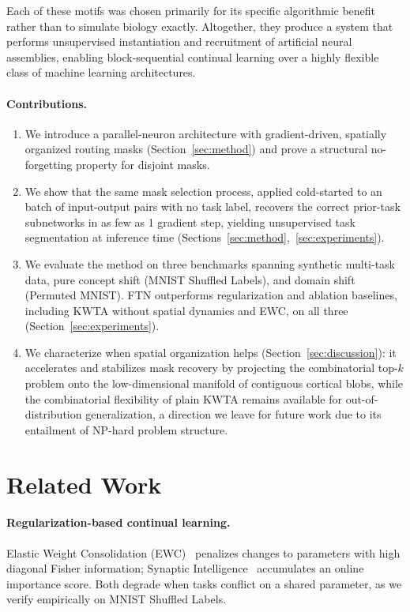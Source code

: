 \documentclass{article}
\begin{document}
Each of these motifs was chosen primarily for its specific algorithmic benefit rather than to simulate biology exactly. Altogether, they produce a system that performs unsupervised instantiation and recruitment of artificial neural assemblies, enabling block-sequential continual learning over a highly flexible class of machine learning architectures.

\paragraph{Contributions.}
\begin{enumerate}
  \item We introduce a parallel-neuron architecture with gradient-driven, spatially organized routing masks (Section~\ref{sec:method}) and prove a structural no-forgetting property for disjoint masks.
  \item We show that the same mask selection process, applied cold-started to an batch of input-output pairs with no task label, recovers the correct prior-task subnetworks in as few as 1 gradient step, yielding unsupervised task segmentation at inference time (Sections~\ref{sec:method},~\ref{sec:experiments}).
  \item We evaluate the method on three benchmarks spanning synthetic multi-task data, pure concept shift (MNIST Shuffled Labels), and domain shift (Permuted MNIST). FTN outperforms regularization and ablation baselines, including KWTA without spatial dynamics and EWC, on all three (Section~\ref{sec:experiments}).
  \item We characterize when spatial organization helps (Section~\ref{sec:discussion}): it accelerates and stabilizes mask recovery by projecting the combinatorial top-$k$ problem onto the low-dimensional manifold of contiguous cortical blobs, while the combinatorial flexibility of plain KWTA remains available for out-of-distribution generalization, a direction we leave for future work due to its entailment of NP-hard problem structure.
\end{enumerate}

\section{Related Work}
\label{sec:related}

\paragraph{Regularization-based continual learning.}
Elastic Weight Consolidation (EWC)~\citep{kirkpatrick2017overcoming} penalizes changes to parameters with high diagonal Fisher information; Synaptic Intelligence~\citep{zenke2017continual} accumulates an online importance score. Both degrade when tasks conflict on a shared parameter, as we verify empirically on MNIST Shuffled Labels.
\end{document}
